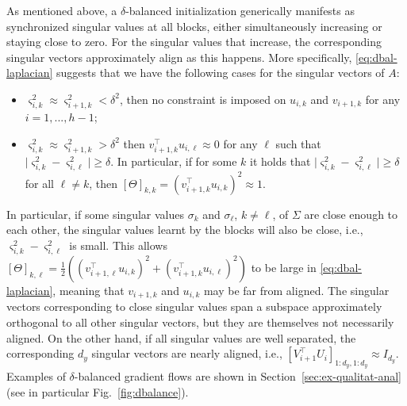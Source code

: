 \documentclass{article}
\newcommand{\1}{\mathds{1}}
\newcommand{\bite}{\begin{itemize}}
\newcommand{\eite}{\end{itemize}}
\begin{document}
As mentioned above, a $ \delta $-balanced initialization generically manifests as synchronized singular values at all blocks, either simultaneously increasing or staying close to zero. 
For the singular values that increase, the corresponding singular vectors approximately align as this happens. More specifically, \eqref{eq:dbal-laplacian} suggests that we have the following cases for the singular vectors of $ A $:
\bite
    \item $ \varsigma_{i,k}^2 \approx \varsigma_{i+1,k}^2 <  \delta^2 $, then no constraint is imposed on $ u_{i,k} $ and $ v_{i+1,k} $ for any $ i = 1,...,h-1$;
    \item $ \varsigma_{i,k}^2 \approx \varsigma_{i+1,k}^2 > \delta^2 $ then $ v_{i+1,k}^\top u_{i,\ell} \approx 0 $ for any $ \ell $ such that $ \lvert \varsigma_{i,k}^2 - \varsigma_{i,\ell}^2 \rvert \geq \delta $. In particular, if for some $ k $ it holds that $ \lvert \varsigma_{i,k}^2 - \varsigma_{i,\ell}^2 \rvert \geq \delta $ for all $ \ell \neq k $, then $ [\Theta]_{k,k} = ( v_{i+1,k}^\top u_{i,k} )^2 \approx 1 $. 
\eite
In particular, if some singular values $ \sigma_k $ and $ \sigma_\ell $, $ k \neq \ell$, of $ \Sigma $ are close enough to each other, the singular values learnt by the blocks will also be close, i.e., $ \varsigma_{i,k}^2 - \varsigma_{i,\ell}^2 $ is small. This allows $ [\Theta]_{k,\ell} = \frac{1}{2} \left( (v_{i+1,\ell}^\top u_{i,k})^2 + (v_{i+1,k}^\top u_{i,\ell})^2 \right) $ to be large in \eqref{eq:dbal-laplacian}, meaning that $ v_{i+1,k} $ and $ u_{i,k} $ may be far from aligned. The singular vectors corresponding to close singular values span a subspace approximately orthogonal to all other singular vectors, but they are themselves not necessarily aligned. On the other hand, if all singular values are well separated, the corresponding $ d_y $ singular vectors are nearly aligned, i.e., $ [V_{i+1}^\top U_i]_{1:d_y,1:d_y} \approx I_{d_y} $. Examples of $ \delta $-balanced gradient flows are shown in Section~\ref{sec:ex-qualitat-anal} (see in particular Fig.~\ref{fig:dbalance}).
\end{document}
